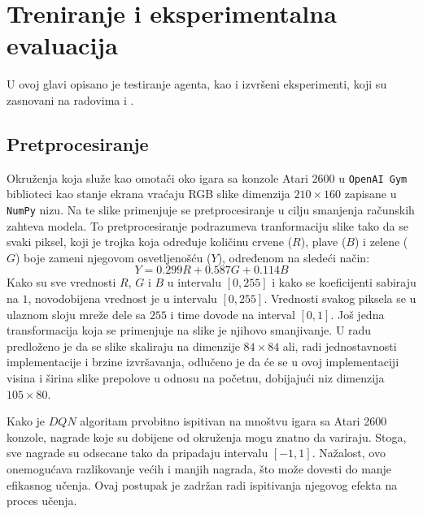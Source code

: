 \chapter{Treniranje i eksperimentalna evaluacija}
\label{ch:treniranje_testiranje}

U ovoj glavi opisano je testiranje agenta, kao i izvršeni eksperimenti, koji su zasnovani na radovima \cite{dqn_mnih} i \cite{dqn_dm}.

\section{Pretprocesiranje}
\label{sec:pretprocesiranje}
Okruženja koja služe kao omotači oko igara sa konzole Atari 2600 u \texttt{OpenAI Gym} biblioteci kao stanje ekrana vraćaju RGB slike dimenzija $210 \times 160$ zapisane u \texttt{NumPy} nizu. Na te slike primenjuje se pretprocesiranje u cilju smanjenja računskih zahteva modela. To pretprocesiranje podrazumeva tranformaciju slike tako da se svaki piksel, koji je trojka koja određuje količinu crvene ($R$), plave ($B$) i zelene ($G$) boje zameni njegovom osvetljenošću ($Y$), određenom na sledeći način:
\begin{equation}
\label{eq:lum}
	Y = 0.299 R + 0.587 G + 0.114 B
\end{equation}
Kako su sve vrednosti $R$, $G$ i $B$ u intervalu $[0, 255]$ i kako se koeficijenti sabiraju na $1$, novodobijena vrednost je u intervalu $[0, 255]$. Vrednosti svakog piksela se u ulaznom sloju mreže dele sa $255$ i time dovode na interval $[0, 1]$. Još jedna transformacija koja se primenjuje na slike je njihovo smanjivanje. U radu \cite{dqn_dm} predloženo je da se slike skaliraju na dimenzije $84 \times 84$ ali, radi jednostavnosti implementacije i brzine izvršavanja, odlučeno je da će se u ovoj implementaciji visina i širina slike prepolove u odnosu na početnu, dobijajući niz dimenzija $105 \times 80$.
\par 
Kako je $DQN$ algoritam prvobitno ispitivan na mnoštvu igara sa Atari 2600 konzole, nagrade koje su dobijene od okruženja mogu znatno da variraju. Stoga, sve nagrade su odsecane tako da pripadaju intervalu $[-1, 1]$. Nažalost, ovo onemogućava razlikovanje većih i manjih nagrada, što može dovesti do manje efikasnog učenja. Ovaj postupak je zadržan radi ispitivanja njegovog efekta na proces učenja.

